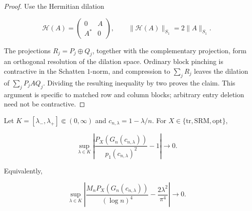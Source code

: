 \begin{proof}
Use the Hermitian dilation

\[
 \mathcal H(A)=
 \begin{pmatrix}0&A\\A^*&0\end{pmatrix},
 \qquad \|\mathcal H(A)\|_{S_1}=2\|A\|_{S_1}.
\]

The projections \(R_j=P_j\oplus Q_j\), together with the complementary
projection, form an orthogonal resolution of the dilation space.  Ordinary
block pinching is contractive in the Schatten \(1\)-norm, and compression to
\(\sum_jR_j\) leaves the dilation of \(\sum_jP_jAQ_j\).  Dividing the
resulting inequality by two proves the claim.  This argument is specific to
matched row and column blocks; arbitrary entry deletion need not be
contractive.
\end{proof}

\begin{theorem}
\label{thm:supp-continuum-interface}
Let \(K=[\lambda_-,\lambda_+]\Subset(0,\infty)\) and
\(c_{n,\lambda}=1-\lambda/n\).  For
\(X\in\{\mathrm{tr},\mathrm{SRM},\mathrm{opt}\}\),

\[
 \sup_{\lambda\in K}
 \left|
 \frac{P_X(G_n(c_{n,\lambda}))}
      {p_1(c_{n,\lambda})^2}-1
 \right|\longrightarrow0.
\]

Equivalently,

\[
 \sup_{\lambda\in K}
 \left|
 \frac{M_nP_X(G_n(c_{n,\lambda}))}{(\log n)^4}
 -\frac{2\lambda^2}{\pi^4}
 \right|\longrightarrow0.
\]
\end{theorem}

